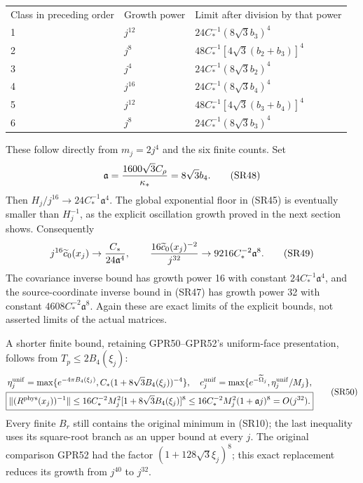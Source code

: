 \documentclass[11pt]{article}
\begin{document}
\begingroup\small\setlength{\tabcolsep}{3pt}\begin{longtable}{@{}p{}p{}p{}@{}}\toprule
Class in preceding order & Growth power & Limit after division by that power\\
1 & \(j^{12}\) & \(24C_*^{-1}(8\sqrt3b_3)^4\)\\
2 & \(j^8\) & \(48C_*^{-1}[4\sqrt3(b_2+b_3)]^4\)\\
3 & \(j^4\) & \(24C_*^{-1}(8\sqrt3b_2)^4\)\\
4 & \(j^{16}\) & \(24C_*^{-1}(8\sqrt3b_4)^4\)\\
5 & \(j^{12}\) & \(48C_*^{-1}[4\sqrt3(b_3+b_4)]^4\)\\
6 & \(j^8\) & \(24C_*^{-1}(8\sqrt3b_3)^4\)\\
\bottomrule\end{longtable}\endgroup

These follow directly from \(m_j=2j^4\) and the six finite counts. Set
\[
\mathfrak a={1600\sqrt3C_\rho\over\kappa_*}=8\sqrt3b_4.
\tag{SR48}
\]
Then \(H_j/j^{16}\to24C_*^{-1}\mathfrak a^4\). The global exponential floor in (SR45) is eventually smaller than \(H_j^{-1}\), as the explicit oscillation growth proved in the next section shows. Consequently
\[
j^{16}\widetilde c_0(x_j)\to{C_*\over24\mathfrak a^4},\qquad
{16\widetilde c_0(x_j)^{-2}\over j^{32}}
\to9216C_*^{-2}\mathfrak a^8.
\tag{SR49}
\]
The covariance inverse bound has growth power 16 with constant \(24C_*^{-1}\mathfrak a^4\), and the source-coordinate inverse bound in (SR47) has growth power 32 with constant \(4608C_*^{-2}\mathfrak a^8\). Again these are exact limits of the explicit bounds, not asserted limits of the actual matrices.

A shorter finite bound, retaining GPR50–GPR52's uniform-face presentation, follows from \(T_p\le2B_4(\xi_j)\):
\[
\begin{gathered}
\eta_j^{\rm unif}=\max\{e^{-4\pi B_4(\xi_j)},C_*(1+8\sqrt3B_4(\xi_j))^{-4}\},\quad
c_j^{\rm unif}=\max\{e^{-\widetilde\Omega_j},\eta_j^{\rm unif}/M_j\},\\
\boxed{\|(R^{\rm phys}(x_j))^{-1}\|
\le16C_*^{-2}M_j^2[1+8\sqrt3B_4(\xi_j)]^8
\le16C_*^{-2}M_j^2(1+\mathfrak a j)^8=O(j^{32}).}
\end{gathered}\tag{SR50}
\]
Every finite \(B_r\) still contains the original minimum in (SR10); the last inequality uses its square-root branch as an upper bound at every \(j\). The original comparison GPR52 had the factor \((1+128\sqrt3\xi_j)^8\); this exact replacement reduces its growth from \(j^{40}\) to \(j^{32}\).
\end{document}
